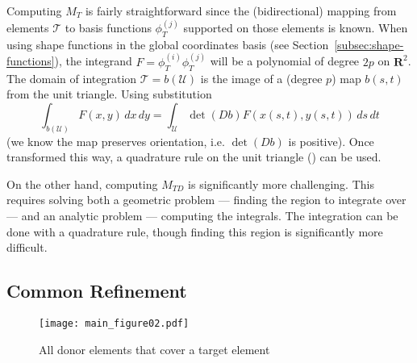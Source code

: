 \documentclass[letterpaper,10pt]{article}
\theoremstyle{definition}
\newcommand{\reals}{\mathbf{R}}
\newcommand{\utri}{\mathcal{U}}
\begin{document}
Computing \(M_T\) is fairly straightforward since the (bidirectional) mapping
from elements \(\mathcal{T}\) to basis functions \(\phi_T^{(j)}\) supported
on those elements is known. When using shape functions in the
global coordinates basis (see Section~\ref{subsec:shape-functions}), the
integrand \(F = \phi_T^{(i)} \phi_T^{(j)}\) will be a polynomial of degree
\(2p\) on \(\reals^2\). The domain of integration \(\mathcal{T}
= b\left(\utri\right)\) is the image of a (degree \(p\)) map \(b(s, t)\)
from the unit triangle. Using substitution
\begin{equation}\label{eq:mass-mat-subst}
\int_{b\left(\utri\right)} F(x, y) \, dx \, dy =
  \int_{\utri} \det(Db) F\left(x(s, t), y(s, t)\right) \, ds \, dt
\end{equation}
(we know the map preserves orientation, i.e. \(\det(Db)\) is positive).
Once transformed this way, a quadrature rule on the unit
triangle (\cite{Dunavant1985}) can be used.

On the other hand, computing \(M_{TD}\) is significantly more
challenging. This requires solving both a geometric problem ---
finding the region to integrate over --- and an analytic
problem --- computing the integrals. The integration can be done with
a quadrature rule, though finding this region is significantly
more difficult.

\subsection{Common Refinement}

\begin{figure}
  \texttt{[image: main\_figure02.pdf]}
  \centering
  \captionsetup{width=.75\linewidth}
  \caption{All donor elements that cover a target element}
  \label{fig:target-elt-all-matching}
\end{figure}
\end{document}
